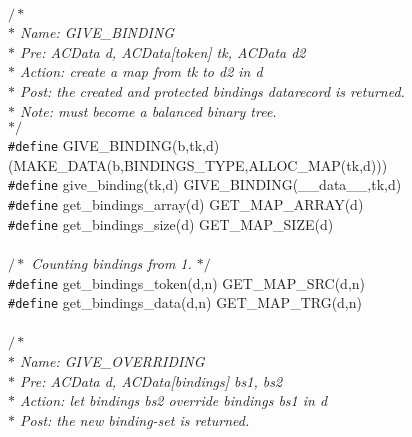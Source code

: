 \begin{flushleft}
\mbox{}\\
{$/\ast$\it{}\mbox{}\\
\hspace*{1\indentation}$\ast$ Name: GIVE\_BINDING\mbox{}\\
\hspace*{1\indentation}$\ast$ Pre: ACData d, ACData[token] tk, ACData d2\mbox{}\\
\hspace*{1\indentation}$\ast$ Action: create a map from tk to d2 in d\mbox{}\\
\hspace*{1\indentation}$\ast$ Post: the created and protected bindings datarecord is returned.\mbox{}\\
\hspace*{1\indentation}$\ast$ Note: must become a balanced binary tree.\mbox{}\\
\hspace*{1\indentation}$\ast/$}\mbox{}\\
{\tt \#define} GIVE\_BINDING(b,tk,d) (MAKE\_DATA(b,BINDINGS\_TYPE,ALLOC\_MAP(tk,d)))\mbox{}\\
{\tt \#define} give\_binding(tk,d) GIVE\_BINDING(\_\_data\_\_,tk,d)\mbox{}\\
{\tt \#define} get\_bindings\_array(d) GET\_MAP\_ARRAY(d)\mbox{}\\
{\tt \#define} get\_bindings\_size(d) GET\_MAP\_SIZE(d)\mbox{}\\
\mbox{}\\
{$/\ast$\it{} Counting bindings from 1. $\ast/$}\mbox{}\\
{\tt \#define} get\_bindings\_token(d,n) GET\_MAP\_SRC(d,n)\mbox{}\\
{\tt \#define} get\_bindings\_data(d,n) GET\_MAP\_TRG(d,n)\mbox{}\\
\mbox{}\\
{$/\ast$\it{}\mbox{}\\
\hspace*{1\indentation}$\ast$ Name: GIVE\_OVERRIDING\mbox{}\\
\hspace*{1\indentation}$\ast$ Pre: ACData d, ACData[bindings] bs1, bs2\mbox{}\\
\hspace*{1\indentation}$\ast$ Action: let bindings bs2 override bindings bs1 in d\mbox{}\\
\hspace*{1\indentation}$\ast$ Post: the new binding-set is returned.\mbox{}\\
}
\end{flushleft}
